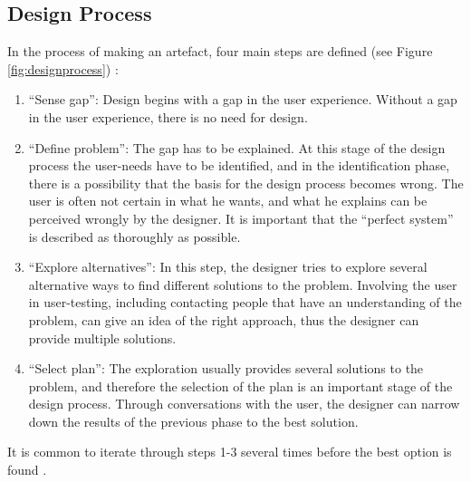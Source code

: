 \subsection{Design Process}
\label{sec:designprocess}
In the process of making an artefact, four main steps are defined (see Figure \ref{fig:designprocess}) :
\begin{enumerate}
 \item ``Sense gap'': Design begins with a gap in the user experience. Without a gap in the user experience, there is no need for design.
 \item ``Define problem'': The gap has to be explained. At this stage of the design process the user-needs have to be identified, and in the identification phase, there is a possibility that the basis for the design process becomes wrong. The user is often not certain in what he wants, and what he explains can be perceived wrongly by the designer. It is important that the ``perfect system'' is described as thoroughly as possible.
 \item ``Explore alternatives'': In this step, the designer tries to explore several alternative ways to find different solutions to the problem. Involving the user in user-testing, including contacting people that have an understanding of the problem, can give an idea of the right approach, thus the designer can provide multiple solutions.
 \item ``Select plan'': The exploration usually provides several solutions to the problem, and therefore the selection of the plan is an important stage of the design process. Through conversations with the user, the designer can narrow down the results of the previous phase to the best solution.
 \end{enumerate}
 It is common to iterate through steps 1-3 several times before the best option is found \cite{ulrich}.
 

